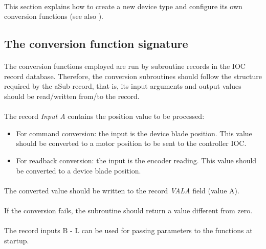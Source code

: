 \documentclass[openany]{article}
\begin{document}
    \paragraph{} This section explains how to create a new device type and configure its own conversion functions (see also ).

    \subsection{The conversion function signature}

        \paragraph{} The conversion functions employed are run by subroutine records in the IOC record database. Therefore, the conversion subroutines should follow the structure required by the aSub record, that is, its input arguments and output values should be read/written from/to the record.

        \paragraph{} The record \emph{Input A} contains the position value to be processed:

        \begin{itemize}
            \item For command conversion: the input is the device blade position. This value should be converted to a motor position to be sent to the controller IOC.
            \item For readback conversion: the input is the encoder reading. This value should be converted to a device blade position.
        \end{itemize}

        \paragraph{} The converted value should be written to the record \emph{VALA} field (value A).

        \paragraph{} If the conversion fails, the subroutine should return a value different from zero.
        
        \paragraph{} The record inputs B - L can be used for passing parameters to the functions at startup.
\end{document}
